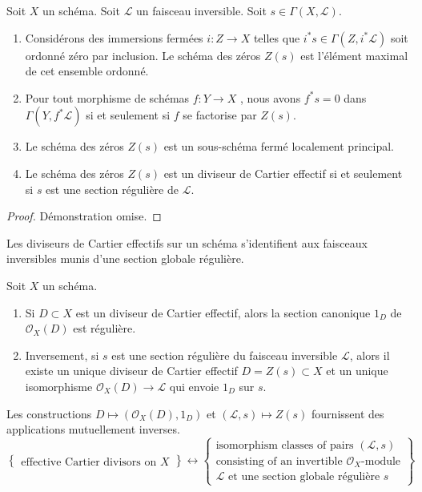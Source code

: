 \begin{lemma}
\label{lemma-zero-scheme}
Soit  $X$  un schéma. Soit  $\mathcal{L}$  un faisceau inversible. Soit
 $s \in \Gamma(X, \mathcal{L})$.
\begin{enumerate}
\item Considérons des immersions fermées  $i : Z \to X$  telles que  $i^*s \in \Gamma(Z, i^*\mathcal{L})$  soit
ordonné zéro par inclusion. Le schéma des zéros  $Z(s)$  est l'élément maximal
de cet ensemble ordonné.
\item Pour tout morphisme de schémas  $f : Y \to X$ , nous avons  $f^*s = 0$  dans
 $\Gamma(Y, f^*\mathcal{L})$  si et seulement si  $f$  se factorise par  $Z(s)$.
\item Le schéma des zéros  $Z(s)$  est un sous-schéma fermé localement principal.
\item Le schéma des zéros  $Z(s)$  est un diviseur de Cartier effectif si et seulement si
 $s$  est une section régulière de  $\mathcal{L}$.
\end{enumerate}
\end{lemma}

\begin{proof}
Démonstration omise.
\end{proof}

\begin{lemma}
\label{lemma-characterize-OD}
\begin{slogan}
Les diviseurs de Cartier effectifs sur un schéma s'identifient aux faisceaux
inversibles munis d'une section globale régulière.
\end{slogan}
Soit  $X$  un schéma.
\begin{enumerate}
\item Si  $D \subset X$  est un diviseur de Cartier effectif, alors la section canonique
 $1_D$  de  $\mathcal{O}_X(D)$  est régulière.
\item Inversement, si  $s$  est une section régulière du faisceau inversible
 $\mathcal{L}$, alors il existe un unique diviseur de Cartier effectif  $D = Z(s) \subset X$ 
et un unique isomorphisme  $\mathcal{O}_X(D) \to \mathcal{L}$  qui envoie  $1_D$  sur  $s$.
\end{enumerate}
Les constructions  $D \mapsto (\mathcal{O}_X(D), 1_D)$  et  $(\mathcal{L}, s) \mapsto Z(s)$  fournissent des applications
mutuellement inverses.
$$
\left\{
\begin{matrix}
\text{effective Cartier divisors on }X
\end{matrix}
\right\}
\leftrightarrow
\left\{
\begin{matrix}
\text{isomorphism classes of pairs }(\mathcal{L}, s)\\
\text{consisting of an invertible }
\mathcal{O}_X\text{-module}\\
\mathcal{L}\text{ et une section globale régulière }s
\end{matrix}
\right\}
$$
\end{lemma}

